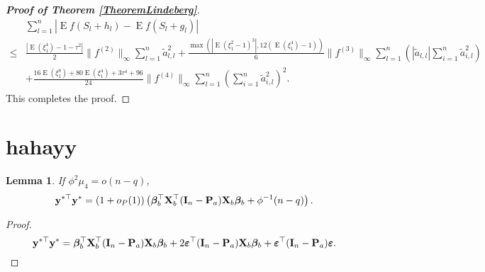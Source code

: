 \documentclass[11pt]{article}
\DeclareMathOperator{\myE}{E}
\newcommand{\By}{\mathbf{y}}    \newcommand{\Bz}{\mathbf{z}}
\newcommand{\bfsym}[1]{\ensuremath{\boldsymbol{#1}}}
\def\bbeta{\bfsym \beta}
\theoremstyle{plain}
\newtheorem{lemma}{\quad\quad Lemma}
\theoremstyle{definition}
\theoremstyle{remark}
\begin{document}
\begin{appendices}
\begin{proof}[\textbf{Proof of Theorem \ref{TheoremLindeberg}}]
    \begin{equation*}
        \begin{split}
             &
             \sum_{l=1}^n \left| \myE f(S_{l}+h_{l})-\myE f(S_{l}+g_{l})\right|
             \\
\leq&
\frac{
\left|
\myE (\xi_1^4)-1
            -
            \tau^2
\right|
}{2}
\|f^{(2)}\|_\infty
\sum_{l=1}^n \tilde a_{l,l}^2
            +
            \frac{
            \max\left(
    \left|\myE (\xi_1^2-1)^3\right|
            ,
12 (\myE (\xi_1^4)-1)
        \right)
            }{6} \|f^{(3)}\|_\infty
            \sum_{l=1}^n 
            \left(|\tilde a_{l,l}|
         \sum_{i=1}^{n} \tilde a_{i,l}^2 
     \right)
         \\
            &+
            \frac{
             16 \myE (\xi_1^8) + 80 \myE (\xi_1^4) + 3\tau^4 + 96 
            }{24} \|f^{(4)} \|_{\infty} 
            \sum_{l=1}^n \left( \sum_{i=1}^n \tilde a_{i,l}^2 \right)^2
            .
        \end{split}
    \end{equation*}
    This completes the proof.
 
\end{proof}


\section{hahayy}
\begin{lemma}\label{lemma:denom}
If $\phi^2\mu_4=o(n-q)$,
\begin{equation*}
    \By^{*\top} \By^*=(1+o_P(1))
    \left(
    \bbeta_b^\top \BX_b^\top (\BI_n-\BP_a) \BX_b \bbeta_b
    + \phi^{-1}(n-q)
\right).
\end{equation*}
\end{lemma}
\begin{proof}
\begin{equation*}
    \By^{*\top} \By^* = \bbeta_b^\top \BX_b^\top (\BI_n-\BP_a) \BX_b \bbeta_b
    +2 \bepsilon^\top (\BI_n -\BP_a) \BX_b \bbeta_b + \bepsilon^\top (\BI_n - \BP_a) \bepsilon.
\end{equation*}



\end{proof}
\end{appendices}
\end{document}
